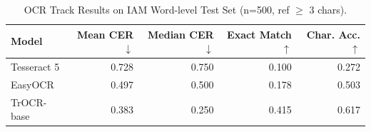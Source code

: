 \begin{table}[h!]
\centering
\caption{OCR Track Results on IAM Word-level Test Set (n=500, ref $\geq$ 3 chars).}
\label{tab:ocr_results}
\begin{tabular}{lrrrr}
\hline
Model & Mean CER $\downarrow$ & Median CER $\downarrow$ & Exact Match $\uparrow$ & Char. Acc. $\uparrow$ \\
\hline
Tesseract 5 & 0.728 & 0.750 & 0.100 & 0.272 \\
EasyOCR & 0.497 & 0.500 & 0.178 & 0.503 \\
TrOCR-base & 0.383 & 0.250 & 0.415 & 0.617 \\
\hline
\end{tabular}
\end{table}

